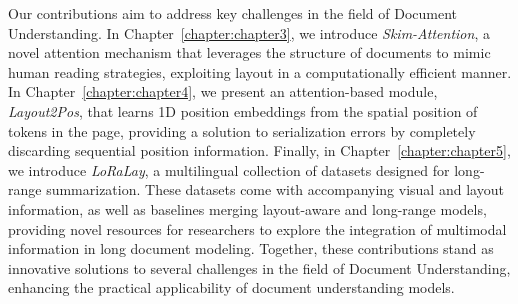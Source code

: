 Our contributions aim to address key challenges in the field of Document Understanding. In Chapter~\ref{chapter:chapter3}, we introduce \textit{Skim-Attention}, a novel attention mechanism that leverages the structure of documents to mimic human reading strategies, exploiting layout in a computationally efficient manner. In Chapter~\ref{chapter:chapter4}, we present an attention-based module, \textit{Layout2Pos}, that learns 1D position embeddings from the spatial position of tokens in the page, providing a solution to serialization errors by completely discarding sequential position information. Finally, in Chapter~\ref{chapter:chapter5}, we introduce \textit{LoRaLay}, a multilingual collection of datasets designed for long-range summarization. These datasets come with accompanying visual and layout information, as well as baselines merging layout-aware and long-range models, providing novel resources for researchers to explore the integration of multimodal information in long document modeling. Together, these contributions stand as innovative solutions to several challenges in the field of Document Understanding, enhancing the practical applicability of document understanding models.


\acresetall
